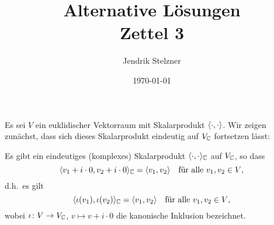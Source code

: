 \documentclass[a4paper,10pt]{article}
\title{Alternative Lösungen \\ Zettel 3}
\author{Jendrik Stelzner}
\date{\today}
\begin{document}
\maketitle


Es sei $V$ ein euklidischer Vektorraum mit Skalarprodukt $\langle \cdot, \cdot \rangle$.
Wir zeigen zunächst, dass sich dieses Skalarprodukt eindeutig auf $V_{\mathbb{C}}$ fortsetzen lässt:

\begin{proposition}
  Es gibt ein eindeutiges (komplexes) Skalarprodukt $\langle \cdot, \cdot \rangle_{\mathbb{C}}$ auf $V_{\mathbb{C}}$, so dass
  \[
      \langle v_1 + i \cdot 0, v_2 + i \cdot 0 \rangle_{\mathbb{C}}
    = \langle v_1, v_2 \rangle
    \quad
    \text{für alle $v_1, v_2 \in V$},
  \]
  d.h.\ es gilt
  \[
    \langle \iota(v_1), \iota(v_2) \rangle_{\mathbb{C}} = \langle v_1, v_2 \rangle
    \quad\text{für alle $v_1, v_2 \in V$},
  \]
  wobei $\iota \colon V \to V_{\mathbb{C}}$, $v \mapsto v + i \cdot 0$ die kanonische Inklusion bezeichnet.
\end{proposition}
\end{document}
